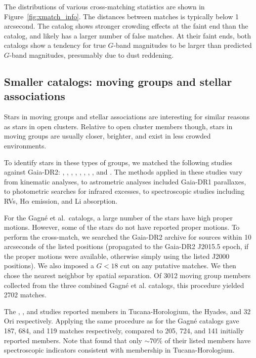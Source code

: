 \documentclass[12pt,twocolumn,tighten,trackchanges]{aastex62}
\begin{document}
The distributions of various cross-matching statistics are shown in
Figure~\ref{fig:xmatch_info}.  The distances between matches is
typically below 1 arcsecond.  The \citeauthor{dias_proper_2014}
catalog shows stronger crowding effects at the faint end than
the \citeauthor{Kharchenko_et_al_2013} catalog, and likely has a
larger number of false matches.  At their faint ends, both catalogs
show a tendency for true $G$-band magnitudes to be larger than
predicted $G$-band magnitudes, presumably due to dust reddening.


\subsection{Smaller catalogs: moving groups and stellar associations}
\label{subsec:mg}

Stars in moving groups and stellar associations are interesting for
similar reasons as stars in open clusters.  
Relative to open cluster members though, stars in moving groups are 
usually closer, brighter, and
exist in less crowded environments.

To identify stars in these types of groups, we matched the following studies
against Gaia-DR2:
\citet{gagne_banyan_XII_2018},
\citet{gagne_banyan_XI_2018},
\citet{gagne_banyan_XIII_2018},
\citet{kraus_tucanahor_2014},
\citet{roser_deep_2011}, %
\citet{bell_32ori_2017},
\citet{rizzuto_multidimensional_2011},
\citet{oh_comoving_2017}, and
\citet{zari_3d_2018}. The methods applied in these studies
vary from kinematic analyses, to astrometric analyses included
Gaia-DR1 parallaxes, to photometric searches for infrared excesses, to
spectroscopic studies including RVs, H$\alpha$
emission, and Li absorption.

For the Gagn\'e et al{.}~catalogs, a large number of the stars have
high proper motions.  However, some of the stars do not have reported
proper motions.  To perform the cross-match, we searched the Gaia-DR2
archive for sources within 10 arcseconds of the listed positions
(propagated to the Gaia-DR2 J2015.5 epoch, if the proper motions were
available, otherwise simply using the listed J2000 positions).  We
also imposed a $G<18$ cut on any putative matches.  We then chose the
nearest neighbor by spatial separation.  Of 3012 moving group members
collected from the three combined Gagn\'e et al{.} catalogs, this
procedure yielded 2702 matches.

The \citet{kraus_tucanahor_2014}, \citet{roser_deep_2011}, and
\citet{bell_32ori_2017} studies reported members in Tucana-Horologium,
the Hyades, and 32$\,$Ori respectively.  Applying the same procedure
as for the Gagn\'e catalogs gave 187, 684, and 119 matches
respectively, compared to 205, 724, and 141 initially reported
members.  Note that \citet{kraus_tucanahor_2014} found that only
$\sim$70\% of their listed members have spectroscopic indicators
consistent with membership in Tucana-Horologium.
\end{document}
